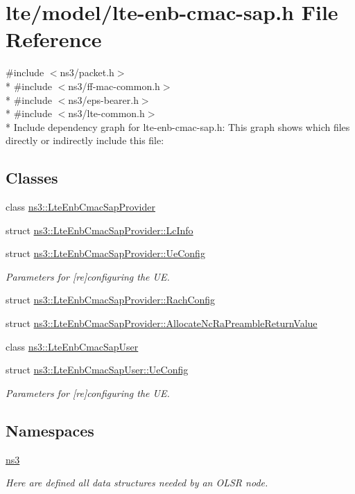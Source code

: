 \hypertarget{lte-enb-cmac-sap_8h}{}\section{lte/model/lte-\/enb-\/cmac-\/sap.h File Reference}
\label{lte-enb-cmac-sap_8h}
{\ttfamily \#include $<$ns3/packet.\+h$>$}\\*
{\ttfamily \#include $<$ns3/ff-\/mac-\/common.\+h$>$}\\*
{\ttfamily \#include $<$ns3/eps-\/bearer.\+h$>$}\\*
{\ttfamily \#include $<$ns3/lte-\/common.\+h$>$}\\*
Include dependency graph for lte-\/enb-\/cmac-\/sap.h\+:
This graph shows which files directly or indirectly include this file\+:
\subsection*{Classes}
\begin{DoxyCompactItemize}
\item 
class \hyperlink{classns3_1_1LteEnbCmacSapProvider}{ns3\+::\+Lte\+Enb\+Cmac\+Sap\+Provider}
\item 
struct \hyperlink{structns3_1_1LteEnbCmacSapProvider_1_1LcInfo}{ns3\+::\+Lte\+Enb\+Cmac\+Sap\+Provider\+::\+Lc\+Info}
\item 
struct \hyperlink{structns3_1_1LteEnbCmacSapProvider_1_1UeConfig}{ns3\+::\+Lte\+Enb\+Cmac\+Sap\+Provider\+::\+Ue\+Config}
\begin{DoxyCompactList}\small\item\em Parameters for \mbox{[}re\mbox{]}configuring the UE. \end{DoxyCompactList}\item 
struct \hyperlink{structns3_1_1LteEnbCmacSapProvider_1_1RachConfig}{ns3\+::\+Lte\+Enb\+Cmac\+Sap\+Provider\+::\+Rach\+Config}
\item 
struct \hyperlink{structns3_1_1LteEnbCmacSapProvider_1_1AllocateNcRaPreambleReturnValue}{ns3\+::\+Lte\+Enb\+Cmac\+Sap\+Provider\+::\+Allocate\+Nc\+Ra\+Preamble\+Return\+Value}
\item 
class \hyperlink{classns3_1_1LteEnbCmacSapUser}{ns3\+::\+Lte\+Enb\+Cmac\+Sap\+User}
\item 
struct \hyperlink{structns3_1_1LteEnbCmacSapUser_1_1UeConfig}{ns3\+::\+Lte\+Enb\+Cmac\+Sap\+User\+::\+Ue\+Config}
\begin{DoxyCompactList}\small\item\em Parameters for \mbox{[}re\mbox{]}configuring the UE. \end{DoxyCompactList}\end{DoxyCompactItemize}
\subsection*{Namespaces}
\begin{DoxyCompactItemize}
\item 
 \hyperlink{namespacens3}{ns3}
\begin{DoxyCompactList}\small\item\em Here are defined all data structures needed by an O\+L\+SR node. \end{DoxyCompactList}\end{DoxyCompactItemize}
